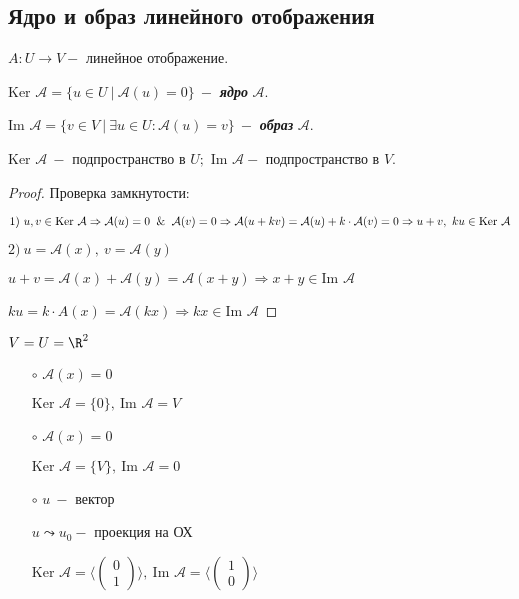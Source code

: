 \subsection{Ядро и образ линейного отображения}

\begin{definition}
    $A:U\rightarrow V-$ линейное отображение.

    $\text{Ker }\mathcal{A}=\{u\in U\ |\ \mathcal{A}(u)=0\}\ -$ 
\textit{\textbf{ядро}} $\mathcal{A}$.

    $\text{Im }\mathcal{A}=\{v\in V\ |\ \exists u\in U:\mathcal{A}(u)=v\}\ 
-$ \textbf{\textit{образ}} $\mathcal{A}$.
\end{definition}

\begin{lemma}
    $\text{Ker } \mathcal{A}\ -$ подпространство в  $U;\text{ Im 
}\mathcal{A}-$ подпространство в $V$.
\end{lemma}

\begin{proof}
    Проверка замкнутости:

    $1)\ u,v\in \text{Ker }\mathcal{A}\Rightarrow \mathcal{A}(u)=0\And 
\mathcal{A}(v)=0\Rightarrow \mathcal{A}(u+kv)=\mathcal{A}(u)+k\cdot 
\mathcal{A}(v)=0\Rightarrow u+v,\ ku\in \text{Ker }\mathcal{A}$

    $2)\ u=\mathcal{A}(x),\ v=\mathcal{A}(y)$

    $u+v=\mathcal{A}(x)+\mathcal{A}(y)=\mathcal{A}(x+y)\Rightarrow x+y\in 
\text{Im }\mathcal{A}$

    $ku=k\cdot A(x)=\mathcal{A}(kx)\Rightarrow kx\in \text{Im 
}\mathcal{A}$
\end{proof}

\begin{example}
    $V=U=\R^2$
    \begin{enumerate}
        \item [$\circ$] $\mathcal{A}(x)=0$ 

        $\text{Ker }\mathcal{A}=\{0\},\ \text{Im }\mathcal{A}=V$

        \item[$\circ$]$\mathcal{A}(x)=0$
    
        $\text{Ker }\mathcal{A}=\{V\},\ \text{Im }\mathcal{A}=0$
    
        \item[$\circ$]$u\ -$ вектор
    
        $u\leadsto u_0-$ проекция на ОХ
    
        $\text{Ker 
}\mathcal{A}=\bigg\langle\begin{pmatrix}0\\1\end{pmatrix}\bigg\rangle,\ 
\text{Im 
}\mathcal{A}=\bigg\langle\begin{pmatrix}1\\0\end{pmatrix}\bigg\rangle$
    \end{enumerate}
\end{example}

